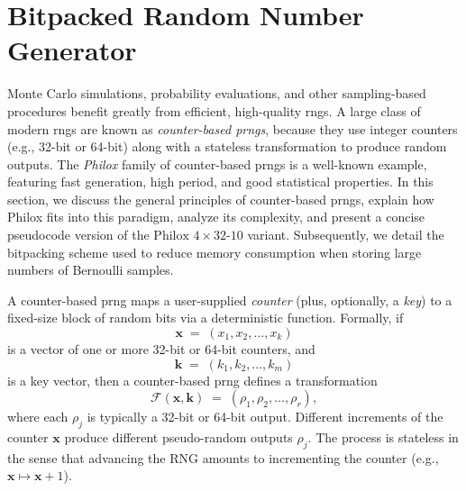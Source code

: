 \section{Bitpacked Random Number Generator}

Monte Carlo simulations, probability evaluations, and other sampling-based procedures benefit greatly from efficient, high-quality \acrfull{rng}s. A large class of modern \acrshort{rng}s are known as \textit{counter-based \acrfull{prng}s}, because they use integer counters (e.g., 32-bit or 64-bit) along with a stateless transformation to produce random outputs. The \emph{Philox} family of counter-based \acrshort{prng}s is a well-known example, featuring fast generation, high period, and good statistical properties. In this section, we discuss the general principles of counter-based \acrshort{prng}s, explain how Philox fits into this paradigm, analyze its complexity, and present a concise pseudocode version of the \(\text{Philox }4\times32\text{-10}\) variant. Subsequently, we detail the bitpacking scheme used to reduce memory consumption when storing large numbers of Bernoulli samples.

A counter-based \acrshort{prng} maps a user-supplied \emph{counter} (plus, optionally, a \emph{key}) to a fixed-size block of random bits via a deterministic function. Formally, if 
\[
  \mathbf{x} \;=\; (x_1, x_2, \ldots, x_k)
\]
is a vector of one or more 32-bit or 64-bit counters, and 
\[
  \mathbf{k} \;=\; (k_1, k_2, \ldots, k_m)
\]
is a key vector, then a counter-based \acrshort{prng} defines a transformation 
\[
   \mathcal{F}(\mathbf{x}, \mathbf{k})
   \;=\;
   (\rho_1, \rho_2, \ldots, \rho_r),
\]
where each \(\rho_j\) is typically a 32-bit or 64-bit output. Different increments of the counter \(\mathbf{x}\) produce different pseudo-random outputs \(\rho_j\). The process is stateless in the sense that advancing the RNG amounts to incrementing the counter (e.g., \(\mathbf{x}\mapsto \mathbf{x} + 1\)).

